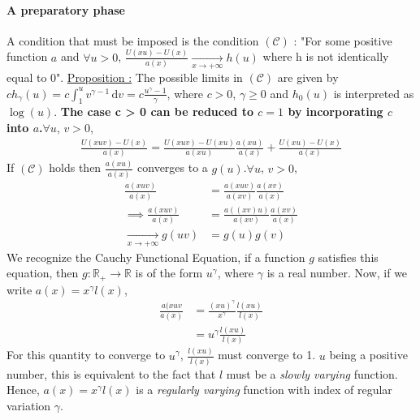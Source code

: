 \paragraph{A preparatory phase} A condition that must be imposed is the condition $(\mathcal{C})$ : "For some positive function $a$ and $\forall u > 0$, $\frac{U(x u) - U(x)}{a(x)} \xrightarrow[x \rightarrow + \infty]{} h(u)$ where h is not identically equal to 0". \newline
\underline{Proposition :} The possible limits in $(\mathcal{C})$ are given by $c h_\gamma(u) = c \int_1^u \! v^{\gamma -1}\, \mathrm{d}v = c \frac{u^\gamma -1}{\gamma}$, where $c > 0$, $\gamma \ge 0$ and $h_0(u)$ is interpreted as $\log(u)$. \newline \textbf{The case c > 0 can be reduced to $c = 1$ by incorporating $c$ into $a$.}\newline $\forall u$, $v > 0$, \newline
\begin{equation}
\begin{alignat*}{2}
\frac{U(x u v) - U(x)}{a(x)} = \frac{U(x u v) - U(x u)}{a(x u)} \frac{a(x u)}{a(x)} + \frac{U(x u) - U(x)}{a(x)}
\end{alignat*}
\end{equation}\newline If $(\mathcal{C})$ holds then $\frac{a(x u)}{a(x)}$ converges to a $g(u)$.\newline $\forall u$, $v > 0$,
\begin{equation}
\begin{alignat*}{2}
\frac{a(x u v)}{a(x)} &= \frac{a(x u v)}{a(x v)} \frac{a(x v)}{a(x)}\\
\implies \frac{a(x u v)}{a(x)} &= \frac{a((x v) u )}{a(x v)} \frac{a(x v)}{a(x)}\\
\xrightarrow[x \rightarrow + \infty]{} g(u v)  &= g(u) g(v)
\end{alignat*}
\end{equation}\newline We recognize the Cauchy Functional Equation, if a function $g$ satisfies this equation, then $g : \mathbb{R}_+ \longrightarrow \mathbb{R}$ is of the form $u^\gamma$, where $\gamma$ is a real number. Now, if we write $a(x) = x^\gamma l(x)$, \newline
\begin{equation}
\begin{alignat*}{2}
\frac{a(x u v}{a(x)} &= \frac{(x u)^\gamma}{x^\gamma} \frac{l(x u)}{l(x)} \\
&= u^\gamma \frac{l(x u)}{l(x)}
\end{alignat*}
\end{equation} \newline For this quantity to converge to $u^\gamma$, $\frac{l(x u)}{l(x)}$ must converge to 1. $u$ being a positive number, this is equivalent to the fact that $l$ must be a \textit{slowly varying} function. Hence, $a(x) = x^\gamma l(x)$ is a \textit{regularly varying} function with index of regular variation $\gamma$.\newline
